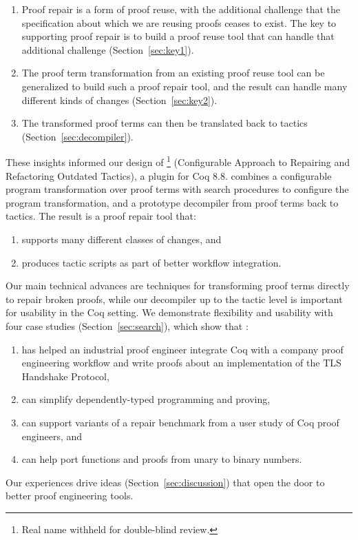 \begin{enumerate}
\item Proof repair is a form of proof reuse, with the additional
challenge that the specification about which
we are reusing proofs ceases to exist.
The key to supporting proof repair is to build a proof reuse
tool that can handle that additional challenge (Section~\ref{sec:key1}). 
\item The proof term transformation from an existing proof reuse tool can be generalized
to build such a proof repair tool, and the result can handle many different kinds of changes (Section~\ref{sec:key2}).
\item The transformed proof terms can then be translated back to tactics (Section~\ref{sec:decompiler}).
\end{enumerate}

These insights informed our design of 
\toolname\footnote{Real name withheld for double-blind review.} (Configurable Approach to Repairing and Refactoring Outdated Tactics), a plugin for Coq 8.8.
\toolname combines a configurable program transformation over proof terms %
with search procedures to configure the program transformation,
and a prototype decompiler from proof terms back to tactics.
The result is a proof repair tool that:

\begin{enumerate}
\item supports many different classes of changes, and
\item produces tactic scripts as part of better workflow integration.
\end{enumerate}
Our main technical advances are techniques for transforming proof terms directly to repair broken proofs, while our decompiler up to the tactic level is important for usability in the Coq setting.
We demonstrate flexibility and usability with four case studies (Section~\ref{sec:search}), which show that \toolname:

\begin{enumerate}
\item has helped an industrial proof engineer integrate Coq with a company proof engineering workflow and write proofs about an implementation
of the TLS Handshake Protocol,
\item can simplify dependently-typed programming and proving,
\item can support variants of a repair benchmark from a user study of Coq proof engineers, and
\item can help port functions and proofs from unary to binary numbers.
\end{enumerate}
Our experiences drive ideas (Section~\ref{sec:discussion}) that open the door to better proof engineering tools.

